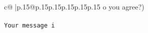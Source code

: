 \documentclass{article}
\begin{document}
{\begin{supertabular}{c@{$\;$}|p{.15\linewidth}@{}p{.15\linewidth}p{.15\linewidth}p{.15\linewidth}p{.15\linewidth}p{.15\linewidth}}
{{{o you agree?)\\ \tt \\ \tt Your message i}}}
\end{supertabular}}
\end{document}
